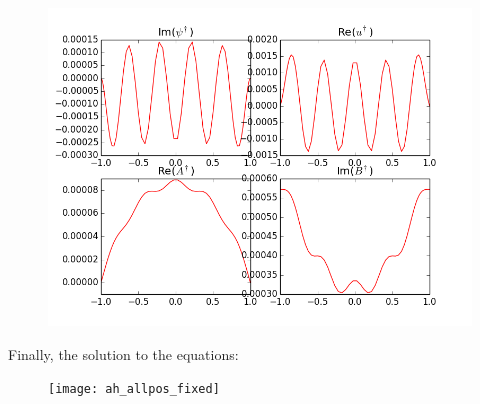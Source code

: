 \documentclass[letterpaper,12pt]{article}
\begin{document}
\begin{figure}[h!]
\centering
\includegraphics[scale=0.5]{nonadjoint_redonly}
\end{figure}


Finally, the solution to the equations:

\begin{figure}[h!]
\centering
\texttt{[image: ah\_allpos\_fixed]}
\end{figure}



\end{document}
